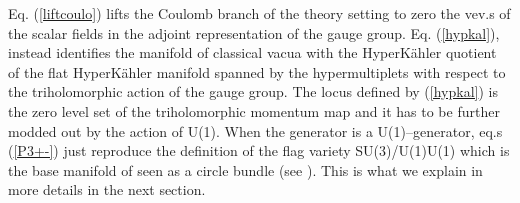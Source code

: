 \documentclass[a4paper,12pt]{article}
\begin{document}
Eq. (\ref{liftcoulo}) lifts the Coulomb branch of the
theory setting to zero the vev.s of the scalar fields in the
adjoint representation of the gauge group. Eq.
(\ref{hypkal}), instead identifies the manifold of classical vacua with the
HyperK\"ahler quotient of the flat HyperK\"ahler manifold spanned by
the hypermultiplets \coordHE{} with respect to the
triholomorphic action of the gauge group.
The locus defined by
(\ref{hypkal}) is the zero level set of the triholomorphic momentum
map and it has to be further modded out by the action of U(1).
When the generator \coordHE{} is a
U(1)--generator, eq.s (\ref{P3+-}) just reproduce the definition
of the flag variety \coordHE{} SU(3)/U(1)\myHighlight{$\times$}\coordHE{}U(1)
which is the base manifold of \coordHE{} seen as a circle bundle (see
\cite{3dcft}). This is what we explain in more details in the next section.
\end{document}
